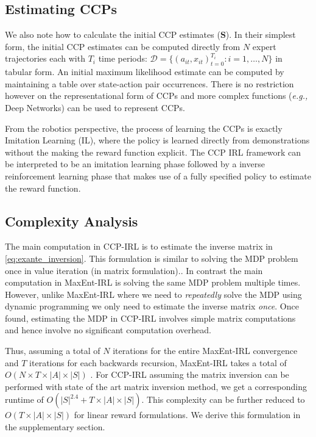 \documentclass{article}
\begin{document}
\subsection{Estimating CCPs}

We also note how to calculate the initial CCP estimates ($\mathbf{S}$). In their simplest form, the initial CCP estimates can be computed directly from $N$ expert trajectories each with $T_i$ time periods:  $\mathcal{D} = \{(a_{it},x_{it})_{t=0}^{T_i}:i=1,\dots,N\}$ in tabular form. An initial maximum likelihood estimate can be computed by maintaining a table over state-action pair occurrences. There is no restriction however on the representational form of CCPs and more complex functions (\emph{e.g.,} Deep Networks) can be used to represent CCPs. 

From the robotics perspective, the process of learning the CCPs is exactly Imitation Learning (IL), where the policy is learned directly from demonstrations without the making the reward function explicit. The CCP IRL framework can be interpreted to be an imitation learning phase followed by a inverse reinforcement learning phase that makes use of a fully specified policy to estimate the reward function.


\subsection{Complexity Analysis}
The main computation in CCP-IRL is to estimate the inverse matrix in \eqref{eq:exante_inversion}. This formulation is similar to solving the MDP problem once in value iteration (in matrix formulation).\cite{?Putterman}. 
In contrast the main computation in MaxEnt-IRL is solving the same MDP problem multiple times.
However, unlike MaxEnt-IRL where we need to \textit{repeatedly} solve the MDP using dynamic programming we only need to estimate the inverse matrix \textit{once}.
Once found, estimating the MDP in CCP-IRL involves simple matrix computations and hence involve no significant computation overhead.

Thus, assuming a total of $N$ iterations for the entire MaxEnt-IRL convergence and $T$ iterations for each backwards recursion, MaxEnt-IRL takes a total of $O(N\times T \times|A|\times|S|)$ \cite{ziebart_phd}. For CCP-IRL assuming the matrix inversion can be performed with state of the art matrix inversion method, we get a corresponding runtime of $O(|S|^{2.4}+T\times|A|\times|S|)$. This complexity can be further reduced to $O(T\times|A|\times|S|)$ for linear reward formulations. We derive this formulation in the supplementary section.
\end{document}
